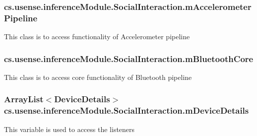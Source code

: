 \subsubsection[{m\+Accelerometer\+Pipeline}]{ cs.\+usense.\+inference\+Module.\+Social\+Interaction.\+m\+Accelerometer\+Pipeline\hspace{0.3cm}{\ttfamily [private]}}\label{classcs_1_1usense_1_1inference_module_1_1_social_interaction_a776cd03378e4775b26c921493c79e049}
This class is to access functionality of Accelerometer pipeline \hypertarget{classcs_1_1usense_1_1inference_module_1_1_social_interaction_ad0f1b8b19badca0a9df86456ffce3e9f}{}
\subsubsection[{m\+Bluetooth\+Core}]{ cs.\+usense.\+inference\+Module.\+Social\+Interaction.\+m\+Bluetooth\+Core\hspace{0.3cm}{\ttfamily [private]}}\label{classcs_1_1usense_1_1inference_module_1_1_social_interaction_ad0f1b8b19badca0a9df86456ffce3e9f}
This class is to access core functionality of Bluetooth pipeline \hypertarget{classcs_1_1usense_1_1inference_module_1_1_social_interaction_a3477d470779b29ee7f22f19df6e3765f}{}
\subsubsection[{m\+Device\+Details}]{\setlength{\rightskip}{0pt plus 5cm}Array\+List$<${\bf Device\+Details}$>$ cs.\+usense.\+inference\+Module.\+Social\+Interaction.\+m\+Device\+Details\hspace{0.3cm}{\ttfamily [static]}}\label{classcs_1_1usense_1_1inference_module_1_1_social_interaction_a3477d470779b29ee7f22f19df6e3765f}
This variable is used to access the listeners \hypertarget{classcs_1_1usense_1_1inference_module_1_1_social_interaction_a76f091e27cb40a22693e8c5bc7c53e45}{}
